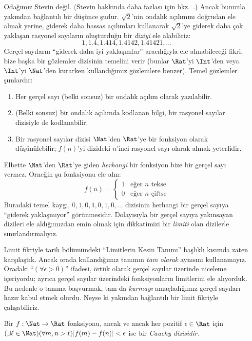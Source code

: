\documentclass[../../../include/open-logic-section]{subfiles}
\begin{document}
Odağımız Stevin değil. (Stevin hakkında daha fazlası için
bkz.\ \citealt{KatzKatz2012}.) Ancak bununla yakından bağlantılı bir düşünce
şudur. $\sqrt{2}$'nin ondalık açılımını doğrudan ele almak yerine, giderek
daha hassas açılımları kullanarak $\sqrt{2}$'ye giderek daha çok yaklaşan
rasyonel sayıların oluşturduğu bir \emph{diziyi} ele alabiliriz:
\[
1, 1.4, 1.414, 1.4142, 1.41421,\ldots
\]
Gerçel sayıların “giderek daha iyi yaklaşımlar” aracılığıyla ele alınabileceği
fikri, bize başka bir gözlemler dizisinin temelini verir (bunlar $\Rat$'yi
$\Int$'den veya $\Int$'yi $\Nat$'den kurarken kullandığımız gözlemlere
benzer). Temel gözlemler şunlardır:
\begin{enumerate}
	\item Her gerçel sayı (belki sonsuz) bir ondalık açılım olarak yazılabilir.
	\item (Belki sonsuz) bir ondalık açılımda kodlanan bilgi, bir rasyonel
	sayılar dizisiyle de kodlanabilir.
	\item Bir rasyonel sayılar dizisi $\Nat$'den $\Rat$'ye bir fonksiyon olarak
	düşünülebilir; $f(n)$'yi dizideki $n$'inci rasyonel sayı olarak almak
	yeterlidir.
\end{enumerate}
Elbette $\Nat$'den $\Rat$'ye giden \emph{herhangi} bir fonksiyon bize bir gerçel
sayı vermez. Örneğin şu fonksiyonu ele alın:
\[
	f(n) =\begin{cases}
			1 & \text{eğer }n\text{ tekse}\\
			0 &\text{eğer }n\text{ çiftse}
		\end{cases}
\]
Buradaki temel kaygı, $0,1,0,1,0,1,0,\ldots$ dizisinin herhangi bir gerçel
sayıya “giderek yaklaşmıyor” görünmesidir. Dolayısıyla bir gerçel sayıya
yakınsayan dizileri ele aldığımızdan emin olmak için dikkatimizi bir
\emph{limiti} olan dizilerle sınırlandırmalıyız.

Limit fikriyle tarih bölümündeki “Limitlerin Kesin Tanımı” başlıklı kısımda
zaten karşılaştık. Ancak orada
kullandığımız tanımın \emph{tam olarak} aynısını kullanamayız. Oradaki
“$(\forall \epsilon>0)$” ifadesi, örtük olarak gerçel sayılar üzerinde
niceleme içeriyordu; ayrıca gerçel sayılar üzerindeki fonksiyonların limitlerini
ele alıyorduk. Bu nedenle o tanıma başvurmak, tam da \emph{kurmayı}
amaçladığımız gerçel sayıları hazır kabul etmek olurdu. Neyse ki yakından
bağlantılı bir limit fikriyle çalışabiliriz.
\begin{defn}
  Bir $f: \Nat \to \Rat$ fonksiyonu, ancak ve ancak her pozitif
  $\epsilon \in \Rat$ için
  $(\exists \ell \in \Nat)(\forall m, n > \ell)|f(m) - f(n)| < \epsilon$
  ise bir \emph{Cauchy dizisidir}.
\end{defn}
\end{document}
